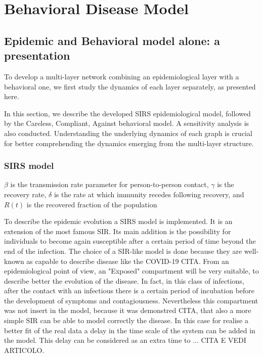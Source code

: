 \part{Behavioral Disease Model}

\chapter{Epidemic and Behavioral model alone: a presentation}



To develop a multi-layer network combining an epidemiological layer with a behavioral one, we first study the dynamics of each layer separately, as presented here. 

In this section, we describe the developed SIRS epidemiological model, followed by the Careless, Compliant, Against behavioral model. A sensitivity analysis is also conducted. Understanding the underlying dynamics of each graph is crucial for better comprehending the dynamics emerging from the multi-layer structure.


\section{SIRS model}
\label{sec:SIRS}

$\beta$ is the transmission rate parameter for person-to-person
contact, $\gamma$ is the recovery rate, $\delta$ is the rate at which
immunity recedes following recovery, and $R(t)$ is the recovered
fraction of the population

To describe the epidemic evolution a  SIRS model is implemented. It is an extension of the most famous SIR. Its main addition is the possibility for individuals to become again susceptible after a certain period of time beyond the end of the infection. The choice of a SIR-like model is done because they are well-known as capable to describe disease like the COVID-19 CITA. From an epidemiological point of view, an "Exposed" compartment will be very suitable, to describe better the evolution of the disease. In fact, in this class of infections, after the contact with an infectious there is a certain period of incubation before the development of symptoms and contagiousness. Nevertheless this compartment was not insert in the model, because it was demonstred CITA, that also a more simple SIR can be able to model correctly the disease. In this case for realise a better fit of the real data a delay in the time scale of the system can be added in the model. This delay can be considered as an extra time to ... CITA E VEDI ARTICOLO.

